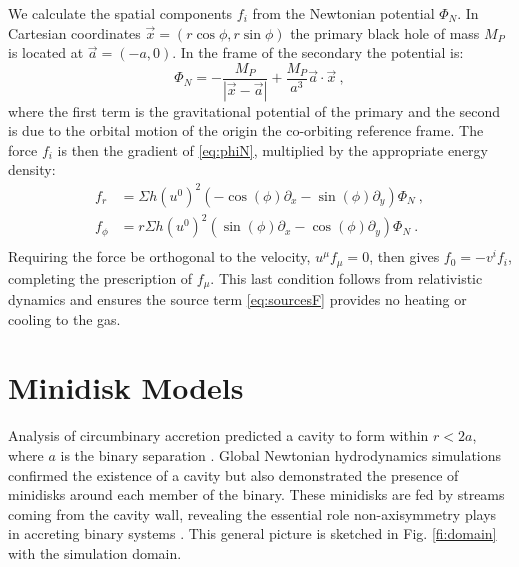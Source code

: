 \documentclass{emulateapj}
\newcommand{\Sig}{\Sigma}
\begin{document}
We calculate the spatial components $f_i$ from the Newtonian potential $\Phi_N$.  In Cartesian coordinates $\vec{x}=(r \cos \phi, r \sin \phi)$ the primary black hole of mass $M_P$ is located at $\vec a = (-a, 0)$.  In the frame of the secondary the potential is:
\begin{equation}
	\Phi_N = -\frac{M_P}{|\vec{x} -  \vec{a} |} + \frac{M_P}{a^3}  \vec{a} \cdot \vec{x} \ , \label{eq:phiN}
\end{equation}
where the first term is the gravitational potential of the primary and the second is due to the orbital motion of the origin the co-orbiting reference frame.  The force $f_i$ is then the gradient of \eqref{eq:phiN}, multiplied by the appropriate energy density:
\begin{align}
	f_r &= \Sig h (u^0)^2 \left( -\cos(\phi) \partial_x  - \sin(\phi)\partial_y\right) \Phi_N \ ,\nonumber \\
	f_\phi &= r\Sig h (u^0)^2 \left( \sin(\phi) \partial_x  -\cos(\phi)\partial_y\right) \Phi_N \ .\nonumber \\
\end{align}
Requiring the force be orthogonal to the velocity, $u^\mu f_\mu = 0$, then gives $f_0 = -v^i f_i$, completing the prescription of $f_\mu$. This last condition follows from relativistic dynamics and ensures the source term \eqref{eq:sourcesF} provides no heating or cooling to the gas.


\section{Minidisk Models}
\label{sec:models}

Analysis of circumbinary accretion predicted a cavity to form within $r<2a$, where $a$ is the binary separation \citep{Milos05}. Global Newtonian hydrodynamics simulations confirmed the existence of a cavity but also demonstrated the presence of minidisks around each member of the binary.  These minidisks are fed by streams coming from the cavity wall, revealing the essential role non-axisymmetry plays in accreting binary systems \citep{Farris14}.  This general picture is sketched in Fig. \ref{fi:domain} with the simulation domain.
\end{document}

